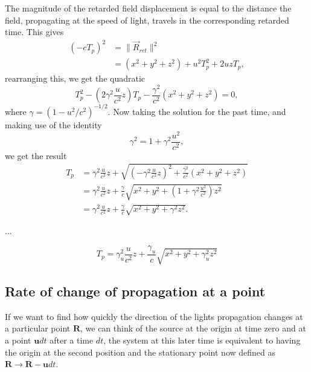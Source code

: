 The magnitude of the retarded field displacement is equal to the distance the field, propagating at the speed of light, travels in the corresponding retarded time. This gives
\begin{equation}
	\begin{split}
		\left( - c T_{p}\right)^2 & = \|\Vec{R}_{ret}\|^2                           \\
		                          & = (x^2 + y^2 + z^2) + u^2 T_{p}^2 + 2u z T_{p},
	\end{split}
\end{equation}
rearranging this, we get the quadratic
\begin{equation}
	T_{p}^{2} - \left(2\gamma^2\frac{u}{c^2} z\right)T_{p} - \frac{\gamma^2}{c^2}(x^2+y^2+z^2) = 0,
\end{equation}
where $\gamma = (1 - u^2/c^2)^{-1/2}$. Now taking the solution for the past time, and making use of the identity
\begin{equation}
	\gamma^2 = 1+\gamma^2\frac{u^2}{c^2},
\end{equation}
we get the result
\begin{equation}
	\begin{split}
		T_{p} & = \gamma^2\frac{u}{c^2}z + \sqrt{\left(-\gamma^2\frac{u}{c^2} z\right)^2+\frac{\gamma^2}{c^2}(x^2+y^2+z^2)} \\
		      & = \gamma^2\frac{u}{c^2}z + \frac{\gamma}{c}\sqrt{x^2+y^2+\left(1+\gamma^2\frac{u^2}{c^2}\right) z^2}        \\
		      & = \gamma^2\frac{u}{c^2}z + \frac{\gamma}{c}\sqrt{x^2+y^2+\gamma^2 z^2}.
	\end{split}
\end{equation}

...

\begin{equation}
	T_{p} = \gamma_u^2 \frac{u}{c^2}z + \frac{\gamma_u}{c} \sqrt{x^2 + y^2 + \gamma_u^2 z^2}
\end{equation}

\subsection{Rate of change of propagation at a point}\label{sect: Rate of change of propagation at a point}

If we want to find how quickly the direction of the lights propagation changes at a particular point $\mathbf{R}$, we can think of the source at the origin at time zero and at a point $\mathbf{u} dt$ after a time $dt$, the system at this later time is equivalent to having the origin at the second position and the stationary point now defined as $\mathbf{R} \rightarrow \mathbf{R} - \mathbf{u} dt$.

